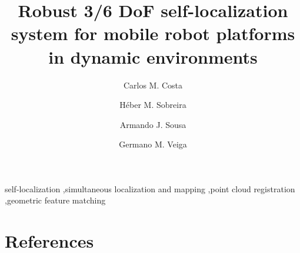 










\begin{frontmatter}

\title{Robust 3/6 DoF self-localization system for mobile robot platforms in dynamic environments}


\author[inesc-address]{Carlos M. Costa}

\author[inesc-address]{Héber M. Sobreira}

\author[inesc-address]{Armando J. Sousa}

\author[inesc-address]{Germano M. Veiga}

\address[inesc-address]{INESC TEC, Rua Dr. Roberto Frias, 4200-465 Porto, Portugal}





\begin{keyword}
self-localization \sep simultaneous localization and mapping \sep point cloud registration \sep geometric feature matching
\end{keyword}

\end{frontmatter}




%






%



\section*{References}






